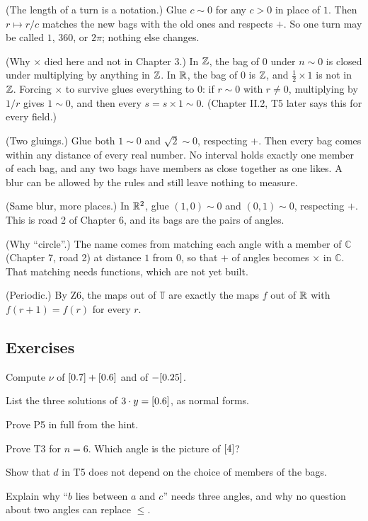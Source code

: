 \begin{lines}
\item[\lab{R1}] (The length of a turn is a notation.) Glue $c \sim 0$ for any $c > 0$ in place of $1$. Then $r \mapsto r / c$ matches the new bags with the old ones and respects $+$. So one turn may be called $1$, $360$, or $2\pi$; nothing else changes.
\item[\lab{R2}] (Why $\times$ died here and not in Chapter 3.) In $\mathbb{Z}$, the bag of $0$ under $n \sim 0$ is closed under multiplying by anything in $\mathbb{Z}$. In $\mathbb{R}$, the bag of $0$ is $\mathbb{Z}$, and $\tfrac12 \times 1$ is not in $\mathbb{Z}$. Forcing $\times$ to survive glues everything to $0$: if $r \sim 0$ with $r \neq 0$, multiplying by $1/r$ gives $1 \sim 0$, and then every $s = s \times 1 \sim 0$. (Chapter II.2, T5 later says this for every field.)
\item[\lab{R3}] (Two gluings.) Glue both $1 \sim 0$ and $\sqrt2 \sim 0$, respecting $+$. Then every bag comes within any distance of every real number. No interval holds exactly one member of each bag, and any two bags have members as close together as one likes. A blur can be allowed by the rules and still leave nothing to measure.
\item[\lab{R4}] (Same blur, more places.) In $\mathbb{R}^2$, glue $(1,0) \sim 0$ and $(0,1) \sim 0$, respecting $+$. This is road 2 of Chapter 6, and its bags are the pairs of angles.
\item[\lab{R5}] (Why ``circle''.) The name comes from matching each angle with a member of $\mathbb{C}$ (Chapter 7, road 2) at distance $1$ from $0$, so that $+$ of angles becomes $\times$ in $\mathbb{C}$. That matching needs functions, which are not yet built.
\item[\lab{R6}] (Periodic.) By Z6, the maps out of $\mathbb{T}$ are exactly the maps $f$ out of $\mathbb{R}$ with $f(r + 1) = f(r)$ for every $r$.
\end{lines}

\subsection*{Exercises}

\begin{lines}
\item[\lab{E1}] Compute $\nu$ of $[0.7] + [0.6]$ and of $-[0.25]$.
\item[\lab{E2}] List the three solutions of $3 \cdot y = [0.6]$, as normal forms.
\item[\lab{E3}] Prove P5 in full from the hint.
\item[\lab{E4}] Prove T3 for $n = 6$. Which angle is the picture of $[4]$?
\item[\lab{E5}] Show that $d$ in T5 does not depend on the choice of members of the bags.
\item[\lab{E6}] Explain why ``$b$ lies between $a$ and $c$'' needs three angles, and why no question about two angles can replace $\le$.
\end{lines}

